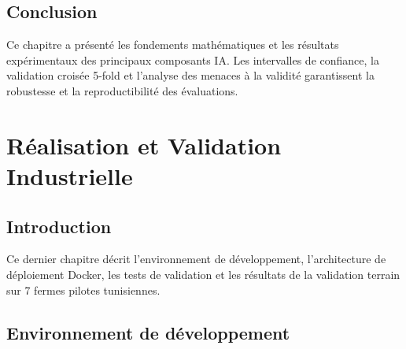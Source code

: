 \documentclass[12pt,a4paper,twoside]{report}
\newcounter{hi}
\begin{document}
\section*{Conclusion}
Ce chapitre a présenté les fondements mathématiques et les résultats
expérimentaux des principaux composants IA. Les intervalles de confiance,
la validation croisée 5-fold et l'analyse des menaces à la validité
garantissent la robustesse et la reproductibilité des évaluations.

\chapter{Réalisation et Validation Industrielle}
\section*{Introduction}
Ce dernier chapitre décrit l'environnement de développement, l'architecture
de déploiement Docker, les tests de validation et les résultats de la
validation terrain sur 7 fermes pilotes tunisiennes.

\section{Environnement de développement}
\end{document}
